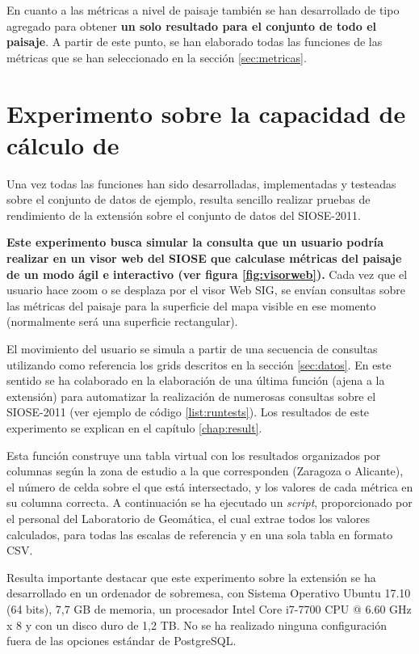 

En cuanto a las métricas a nivel de paisaje también se han desarrollado de tipo agregado para obtener \textbf{un solo resultado para el conjunto de todo el paisaje}. A partir de este punto, se han elaborado todas las funciones de las métricas que se han seleccionado en la sección \ref{sec:metricas}.

\section{Experimento sobre la capacidad de cálculo de \pgland{}\label{sec:exp}}

Una vez todas las funciones han sido desarrolladas, implementadas y testeadas sobre el conjunto de datos de ejemplo, resulta sencillo realizar pruebas de rendimiento de la extensión \pgland{} sobre el conjunto de datos del SIOSE-2011.

\textbf{Este experimento busca simular la consulta que un usuario podría realizar en un visor web del SIOSE que calculase métricas del paisaje de un modo ágil e interactivo (ver figura \ref{fig:visorweb}).} Cada vez que el usuario hace zoom o se desplaza por el visor Web SIG, se envían consultas sobre las métricas del paisaje para la superficie del mapa visible en ese momento (normalmente será una superficie rectangular). 

El movimiento del usuario se simula a partir de una secuencia de consultas utilizando como referencia los grids descritos en la sección \ref{sec:datos}. En este sentido se ha colaborado en la elaboración de una última función (ajena a la extensión) para automatizar la realización de numerosas consultas sobre el SIOSE-2011 (ver ejemplo de código \ref{list:runtests}). Los resultados de este experimento se explican en el capítulo \ref{chap:result}.

\label{list:runtests}

Esta función construye una tabla virtual con los resultados organizados por columnas según la zona de estudio a la que corresponden (Zaragoza o Alicante), el número de celda sobre el que está intersectado, y los valores de cada métrica en su columna correcta. A continuación se ha ejecutado un \textit{script}, proporcionado por el personal del Laboratorio de Geomática, el cual extrae todos los valores calculados, para todas las escalas de referencia y en una sola tabla en formato CSV.

Resulta importante destacar que este experimento sobre la extensión \pgland{} se ha desarrollado en un ordenador de sobremesa, con Sistema Operativo Ubuntu 17.10 (64 bits), 7,7 GB de memoria, un procesador Intel Core i7-7700 CPU @ 6.60 GHz x 8 y con un disco duro de 1,2 TB. No se ha realizado ninguna configuración fuera de las opciones estándar de PostgreSQL.


